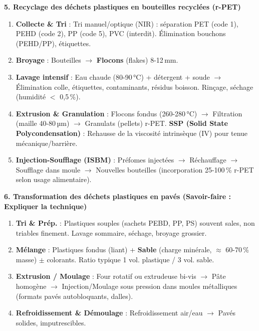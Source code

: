 \documentclass[11pt]{article}
\begin{document}
\begin{bilan}
\textbf{5. Recyclage des déchets plastiques en bouteilles recyclées (r-PET)}
\begin{methode}
\begin{enumerate}
    \item \textbf{Collecte \& Tri} : Tri manuel/optique (NIR) : séparation PET (code 1), PEHD (code 2), PP (code 5), PVC (interdit). Élimination bouchons (PEHD/PP), étiquettes.
    \item \textbf{Broyage} : Bouteilles $\to$ \textbf{Flocons} (flakes) 8-12\,mm.
    \item \textbf{Lavage intensif} : Eau chaude (80-90\,°C) + détergent + soude $\to$ Élimination colle, étiquettes, contaminants, résidus boisson. Rinçage, séchage (humidité $<$ 0,5\,\%).
    \item \textbf{Extrusion \& Granulation} : Flocons fondus (260-280\,°C) $\to$ Filtration (maille 40-80\,µm) $\to$ Granulats (pellets) r-PET. \textbf{SSP (Solid State Polycondensation)} : Rehausse de la viscosité intrinsèque (IV) pour tenue mécanique/barrière.
    \item \textbf{Injection-Soufflage (ISBM)} : Préfomes injectées $\to$ Réchauffage $\to$ Soufflage dans moule $\to$ Nouvelles bouteilles (incorporation 25-100\,\% r-PET selon usage alimentaire).
\end{enumerate}
\end{methode}

\textbf{6. Transformation des déchets plastiques en pavés (Savoir-faire : Expliquer la technique)}
\begin{methode}
\begin{enumerate}
    \item \textbf{Tri \& Prép.} : Plastiques souples (sachets PEBD, PP, PS) souvent sales, non triables finement. Lavage sommaire, séchage, broyage grossier.
    \item \textbf{Mélange} : Plastiques fondus (liant) + \textbf{Sable} (charge minérale, $\approx$ 60-70\,\% masse) $\pm$ colorants. Ratio typique 1 vol. plastique / 3 vol. sable.
    \item \textbf{Extrusion / Moulage} : Four rotatif ou extrudeuse bi-vis $\to$ Pâte homogène $\to$ Injection/Moulage sous pression dans moules métalliques (formats pavés autobloquants, dalles).
    \item \textbf{Refroidissement \& Démoulage} : Refroidissement air/eau $\to$ Pavés solides, imputrescibles.
\end{enumerate}
\end{methode}


\end{bilan}
\end{document}
